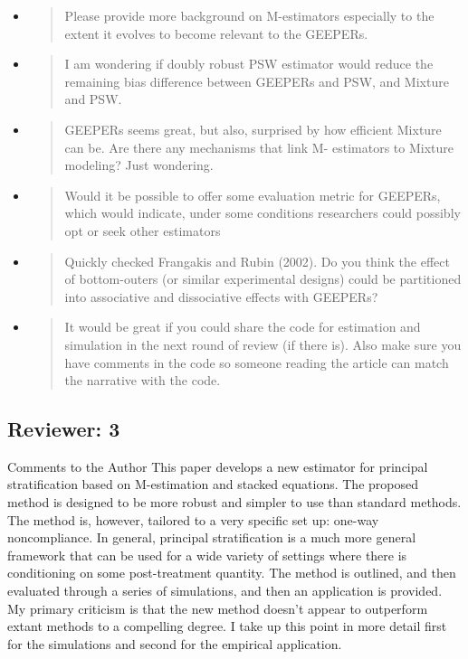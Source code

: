\documentclass[]{article}
\begin{document}
\begin{itemize}
\item
  \begin{quote} Please provide more background on M-estimators especially to the extent it evolves to become relevant to the
    GEEPERs.
    \end{quote}
\item
  \begin{quote}
I am wondering if doubly robust PSW estimator would reduce the remaining bias difference between GEEPERs and
PSW, and Mixture and PSW.
    \end{quote}

\item
  \begin{quote}
    GEEPERs seems great, but also, surprised by how efficient Mixture can be. Are there any mechanisms that link M-
    estimators to Mixture modeling? Just wondering.
        \end{quote}

\item
  \begin{quote}
    Would it be possible to offer some evaluation metric for GEEPERs,
    which would indicate, under some conditions researchers could
    possibly opt or seek other estimators
  \end{quote}

\item
  \begin{quote}
    Quickly checked Frangakis and Rubin (2002). Do you think the effect of bottom-outers (or similar experimental
designs) could be partitioned into associative and dissociative
effects with GEEPERs?
    \end{quote}

\item
  \begin{quote}
    It would be great if you could share the code for estimation and simulation in the next round of review (if there is). Also
make sure you have comments in the code so someone reading the article
can match the narrative with the code.
    \end{quote}


\end{itemize}

\subsection{Reviewer: 3}
Comments to the Author
This paper develops a new estimator for principal stratification based on M-estimation and stacked equations. The proposed
method is designed to be more robust and simpler to use than standard methods. The method is, however, tailored to a very
specific set up: one-way noncompliance. In general, principal stratification is a much more general framework that can be
used for a wide variety of settings where there is conditioning on some post-treatment quantity.
The method is outlined, and then evaluated through a series of simulations, and then an application is provided. My primary
criticism is that the new method doesn't appear to outperform extant methods to a compelling degree. I take up this point in
more detail first for the simulations and second for the empirical
application.
\end{document}
